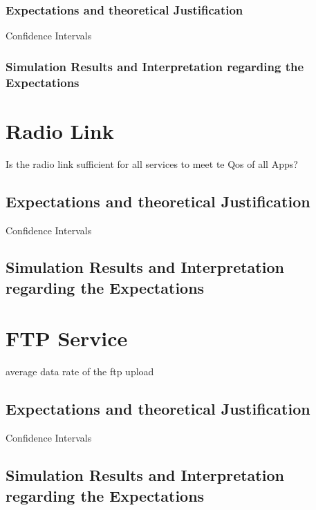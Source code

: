 \documentclass[a4paper,10pt]{report}
\begin{document}
\subsubsection{Expectations and theoretical Justification}
Confidence Intervals 
\subsubsection{Simulation Results and Interpretation regarding the Expectations}
\section{Radio Link}
Is the radio link sufficient for all services to meet te Qos of all Apps?
\subsection{Expectations and theoretical Justification}
Confidence Intervals 
\subsection{Simulation Results and Interpretation regarding the Expectations}

\section{FTP Service}
average data rate of the ftp upload
\subsection{Expectations and theoretical Justification}
Confidence Intervals 
\subsection{Simulation Results and Interpretation regarding the Expectations}
\end{document}
